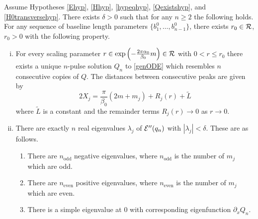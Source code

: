 \documentclass[thesis.tex]{subfiles}
\begin{document}
\begin{theorem}\label{multipulseexistR}
Assume Hypotheses \ref{Ehyp}, \ref{Hhyp}, \ref{hypeqhyp}, \ref{Qexistshyp}, and \ref{H0transversehyp}. There exists $\delta > 0$ such that for any $n \geq 2$ the following holds. For any sequence of baseline length parameters $\{ b_1^0, \dots, b_{n-1}^0 \}$, there exists $r_0 \in \mathcal{R}$, $r_0 > 0$ with the following property.
\begin{enumerate}[(i)]
\item For every scaling parameter $r \in \mathop\mathrm{exp}\nolimits\left(-\frac{2 \pi \alpha_0}{\beta_0}m \right) \in \mathcal{R}$ with $0 < r \leq r_0$ there exists a unique $n$-pulse solution $Q_n$ to \cref{genODE} which resembles $n$ consecutive copies of $Q$. The distances between consecutive peaks are given by
\[
2 X_j = \frac{\pi}{\beta_0}(2 m + m_j) + R_j(r) + \tilde{L}
\]
where $\tilde{L}$ is a constant and the remainder terms $R_j(r) \rightarrow 0$ as $r \rightarrow 0$.

\item There are exactly $n$ real eigenvalues $\lambda_j$ of $\mathcal{E}''(q_n)$ with $|\lambda_j| < \delta$. These are as follows.
\begin{enumerate}
	\item There are $n_{\text{odd}}$ negative eigenvalues, where $n_{\text{odd}}$ is the number of $m_j$ which are odd.
	\item There are $n_{\text{even}}$ positive eigenvalues, where $n_{\text{even}}$ is the number of $m_j$ which are even.
	\item There is a simple eigenvalue at 0 with corresponding eigenfunction $\partial_x Q_n$.
\end{enumerate}


\end{enumerate}
\end{theorem}
\end{document}
